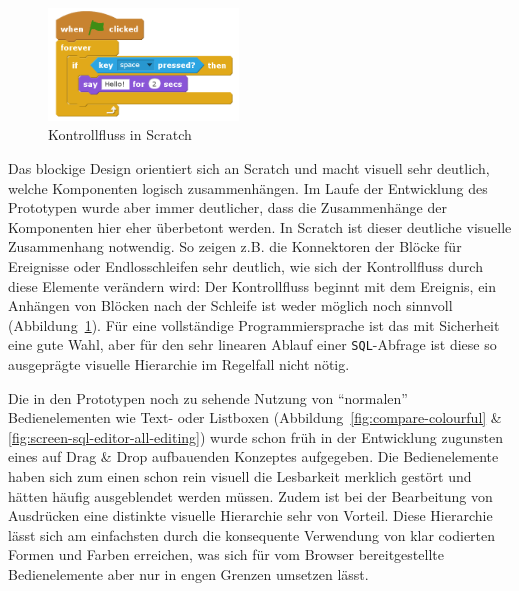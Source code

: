 
\begin{figure}
  \includegraphics[width=0.45\textwidth]{images/scratch-control-flow}
  \caption{Kontrollfluss in Scratch}
  \label{fig:screen-scratch-control-flow}
\end{figure}

Das blockige Design orientiert sich an Scratch und macht visuell sehr deutlich, welche Komponenten logisch zusammenhängen. Im Laufe der Entwicklung des Prototypen wurde aber immer deutlicher, dass die Zusammenhänge der Komponenten hier eher überbetont werden. In Scratch ist dieser deutliche visuelle Zusammenhang notwendig. So zeigen z.B. die Konnektoren der Blöcke für Ereignisse oder Endlosschleifen sehr deutlich, wie sich der Kontrollfluss durch diese Elemente verändern wird: Der Kontrollfluss beginnt mit dem Ereignis, ein Anhängen von Blöcken nach der Schleife ist weder möglich noch sinnvoll (Abbildung~\ref{fig:screen-scratch-control-flow}).  Für eine vollständige Programmiersprache ist das mit Sicherheit eine gute Wahl, aber für den sehr linearen Ablauf einer \texttt{SQL}-Abfrage ist diese so ausgeprägte visuelle Hierarchie im Regelfall nicht nötig.

Die in den Prototypen noch zu sehende Nutzung von "`normalen"' Bedienelementen wie Text- oder Listboxen (Abbildung~\ref{fig:compare-colourful} \& \ref{fig:screen-sql-editor-all-editing}) wurde schon früh in der Entwicklung zugunsten eines auf Drag \& Drop aufbauenden Konzeptes aufgegeben. Die Bedienelemente haben sich zum einen schon rein visuell die Lesbarkeit merklich gestört und hätten häufig ausgeblendet werden müssen. Zudem ist bei der Bearbeitung von Ausdrücken eine distinkte visuelle Hierarchie sehr von Vorteil. Diese Hierarchie lässt sich am einfachsten durch die konsequente Verwendung von klar codierten Formen und Farben erreichen, was sich für vom Browser bereitgestellte Bedienelemente aber nur in engen Grenzen umsetzen lässt.

